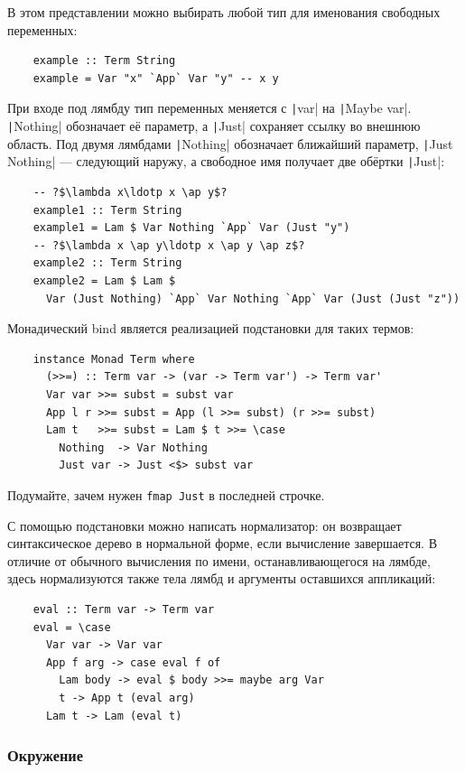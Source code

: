 В этом представлении можно выбирать любой тип для именования свободных переменных:
\begin{verbatim}
    example :: Term String
    example = Var "x" `App` Var "y" -- x y
\end{verbatim}
При входе под лямбду тип переменных меняется с \texttt|var| на \texttt|Maybe var|.
\texttt|Nothing| обозначает её параметр, а \texttt|Just| сохраняет ссылку во внешнюю область.
Под двумя лямбдами \texttt|Nothing| обозначает ближайший параметр, \texttt|Just Nothing| --- следующий наружу, а свободное имя получает две обёртки \texttt|Just|:
\begin{verbatim}
    -- ?$\lambda x\ldotp x \ap y$?
    example1 :: Term String
    example1 = Lam $ Var Nothing `App` Var (Just "y")
    -- ?$\lambda x \ap y\ldotp x \ap y \ap z$?
    example2 :: Term String
    example2 = Lam $ Lam $
      Var (Just Nothing) `App` Var Nothing `App` Var (Just (Just "z"))
\end{verbatim}

Монадический bind является реализацией подстановки для таких термов:
\begin{verbatim}
    instance Monad Term where
      (>>=) :: Term var -> (var -> Term var') -> Term var'
      Var var >>= subst = subst var
      App l r >>= subst = App (l >>= subst) (r >>= subst)
      Lam t   >>= subst = Lam $ t >>= \case
        Nothing  -> Var Nothing
        Just var -> Just <$> subst var
\end{verbatim}

\begin{task}
    Подумайте, зачем нужен \texttt{fmap Just} в последней строчке.
\end{task}

С помощью подстановки можно написать нормализатор: он возвращает синтаксическое дерево в нормальной форме, если вычисление завершается.
В отличие от обычного вычисления по имени, останавливающегося на лямбде, здесь нормализуются также тела лямбд и аргументы оставшихся аппликаций:

\begin{verbatim}
    eval :: Term var -> Term var
    eval = \case
      Var var -> Var var
      App f arg -> case eval f of
        Lam body -> eval $ body >>= maybe arg Var
        t -> App t (eval arg)
      Lam t -> Lam (eval t)
\end{verbatim}

\subsubsection{Окружение}

